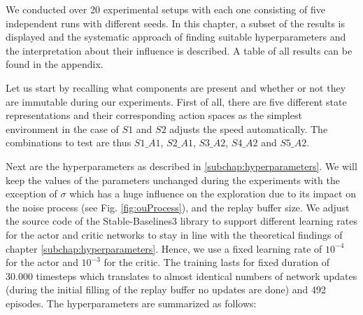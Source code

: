 We conducted over 20 experimental setups with each one consisting of five independent runs with different seeds. In this chapter, a subset of the results is displayed and the systematic approach of finding suitable hyperparameters and the interpretation about their influence is described. A table of all results can be found in the appendix.
\par
Let us start by recalling what components are present and whether or not they are immutable during our experiments. First of all, there are five different state representations and their corresponding action spaces as the simplest environment in the case of $S1$ and $S2$ adjusts the speed automatically. The combinations to test are thus $S1\_A1$, $S2\_A1$, $S3\_A2$, $S4\_A2$ and $S5\_A2$.
\par
Next are the hyperparameters as described in \ref{subchap:hyperparameters}. We will keep the values of the parameters unchanged during the experiments with the exception of $\sigma$ which has a huge influence on the exploration due to its impact on the noise process (see Fig. \ref{fig:ouProcess}), and the replay buffer size. We adjust the source code of the Stable-Baselines3 library to support different learning rates for the actor and critic networks to stay in line with the theoretical findings of chapter \ref{subchap:hyperparameters}. Hence, we use a fixed learning rate of $10^{-4}$ for the actor and  $10^{-3}$ for the critic. The training lasts for fixed duration of 30.000 timesteps which translates to almost identical numbers of network updates (during the initial filling of the replay buffer no updates are done) and 492 episodes. The hyperparameters are summarized as follows:

